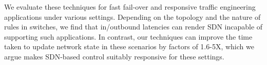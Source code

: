  We evaluate these techniques for fast fail-over and responsive
 traffic engineering applications under various settings. Depending on
 the topology and the nature of rules in switches, we find that
in/outbound latencies can render SDN incapable of supporting such
applications. In contrast, 
our techniques can
 improve the time taken to update network state in these scenarios by factors
 of 1.6-5X, which we argue makes SDN-based control suitably responsive for these
 settings.









 

